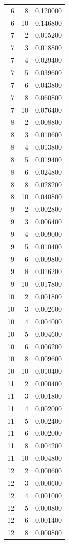 \begin{tabular}{rrr}
6 & 8 & 0.120000 \\
6 & 10 & 0.146800 \\
7 & 2 & 0.015200 \\
7 & 3 & 0.018800 \\
7 & 4 & 0.029400 \\
7 & 5 & 0.039600 \\
7 & 6 & 0.043800 \\
7 & 8 & 0.060800 \\
7 & 10 & 0.076400 \\
8 & 2 & 0.008800 \\
8 & 3 & 0.010600 \\
8 & 4 & 0.013800 \\
8 & 5 & 0.019400 \\
8 & 6 & 0.024800 \\
8 & 8 & 0.028200 \\
8 & 10 & 0.040800 \\
9 & 2 & 0.002800 \\
9 & 3 & 0.006400 \\
9 & 4 & 0.009000 \\
9 & 5 & 0.010400 \\
9 & 6 & 0.009800 \\
9 & 8 & 0.016200 \\
9 & 10 & 0.017800 \\
10 & 2 & 0.001800 \\
10 & 3 & 0.002600 \\
10 & 4 & 0.004000 \\
10 & 5 & 0.004600 \\
10 & 6 & 0.006200 \\
10 & 8 & 0.009600 \\
10 & 10 & 0.010400 \\
11 & 2 & 0.000400 \\
11 & 3 & 0.001800 \\
11 & 4 & 0.002000 \\
11 & 5 & 0.002400 \\
11 & 6 & 0.002000 \\
11 & 8 & 0.004200 \\
11 & 10 & 0.004800 \\
12 & 2 & 0.000600 \\
12 & 3 & 0.000600 \\
12 & 4 & 0.001000 \\
12 & 5 & 0.000800 \\
12 & 6 & 0.001400 \\
12 & 8 & 0.000800 \\

\end{tabular}
